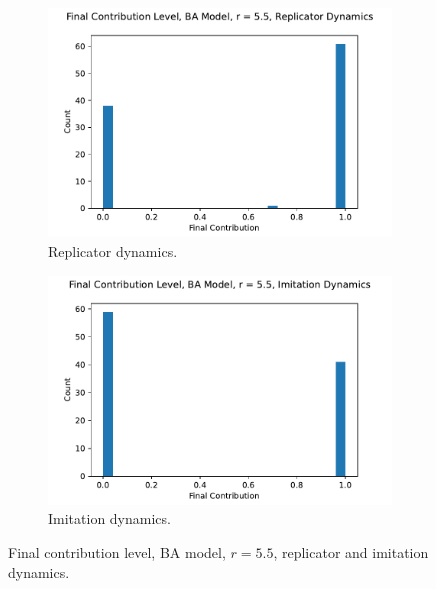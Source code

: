 \FloatBarrier 
\begin{figure}[!h]
  \begin{subfigure}[b]{0.45\textwidth}
    \includegraphics[width=1.1\textwidth]{images/Rep_coop_histo_BA_55.pdf}
    \caption{Replicator dynamics.}
    \label{Rep_BA_55_coop_histo}
  \end{subfigure}
  \hfill
  \begin{subfigure}[b]{0.45\textwidth}
    \includegraphics[width=1.1\textwidth]{images/ID_coop_histo_BA_55.pdf}
    \caption{Imitation dynamics. }
    \label{ID_BA_55_coop_histo}
  \end{subfigure}
  \caption{Final contribution level, BA model, $r = 5.5$, replicator and imitation dynamics. } \label{coop_histo_BA}
\end{figure} 
\FloatBarrier

